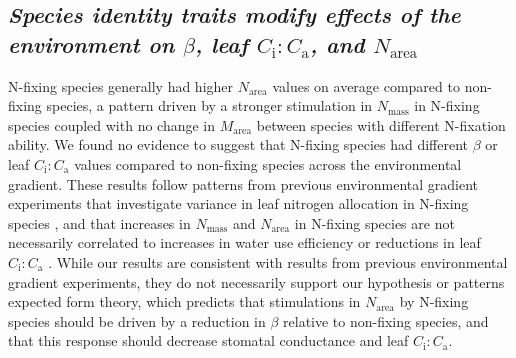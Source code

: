 \begin{singlespace}
\subsection{\textit{Species identity traits modify effects of the environment on $\beta$, leaf $C_\mathrm{i}\mathrm{:}C_\mathrm{a}$, and $N_\mathrm{area}$}}
\end{singlespace}
\noindent N-fixing species generally had higher $N_\mathrm{area}$ values on average compared to non-fixing species, a pattern driven by a stronger stimulation in $N_\mathrm{mass}$ in N-fixing species coupled with no change in $M_\mathrm{area}$ between species with different N-fixation ability. We found no evidence to suggest that N-fixing species had different $\beta$ or leaf $C_\mathrm{i}\mathrm{:}C_\mathrm{a}$ values compared to non-fixing species across the environmental gradient. These results follow patterns from previous environmental gradient experiments that investigate variance in leaf nitrogen allocation in N-fixing species , and that increases in $N_\mathrm{mass}$ and $N_\mathrm{area}$ in N-fixing species are not necessarily correlated to increases in water use efficiency or reductions in leaf $C_\mathrm{i}\mathrm{:}C_\mathrm{a}$ . While our results are consistent with results from previous environmental gradient experiments, they do not necessarily support our hypothesis or patterns expected form theory, which predicts that stimulations in $N_\mathrm{area}$ by N-fixing species should be driven by a reduction in $\beta$ relative to non-fixing species, and that this response should decrease stomatal conductance and leaf $C_\mathrm{i}\mathrm{:}C_\mathrm{a}$.
    
